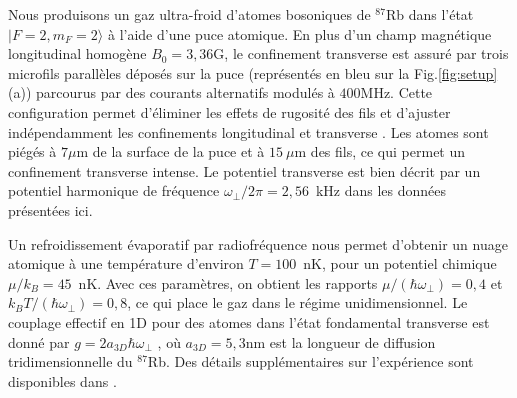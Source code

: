 


Nous produisons un gaz ultra-froid d’atomes bosoniques de $^{87}$Rb dans l’état $|F=2,m_F=2\rangle$ à l’aide d’une puce atomique. En plus d’un champ magnétique longitudinal homogène $B_0 = 3{,}36$G, le confinement transverse est assuré par trois microfils parallèles déposés sur la puce (représentés en bleu sur la Fig.\ref{fig:setup}(a)) parcourus par des courants alternatifs modulés à $400$MHz. Cette configuration permet d’éliminer les effets de rugosité des fils et d’ajuster indépendamment les confinements longitudinal et transverse \cite{PhysRevLett.98.263201}. Les atomes sont piégés à $7\mu$m de la surface de la puce et à $15~\mu$m des fils, ce qui permet un confinement transverse intense. Le potentiel transverse est bien décrit par un potentiel harmonique de fréquence $\omega_{\perp}/2\pi = 2{,}56$~kHz dans les données présentées ici.


Un refroidissement évaporatif par radiofréquence nous permet d’obtenir un nuage atomique à une température d’environ $T = 100$~nK, pour un potentiel chimique $\mu / k_B = 45$~nK. Avec ces paramètres, on obtient les rapports $\mu / (\hbar \omega_{\perp}) = 0{,}4$ et $k_B T / (\hbar \omega_{\perp}) = 0{,}8$, ce qui place le gaz dans le régime unidimensionnel. Le couplage effectif en 1D pour des atomes dans l’état fondamental transverse est donné par $g = 2 a_{3D} \hbar \omega_{\perp}$ \cite{PhysRevLett.81.938}, où $a_{3D} = 5{,}3$nm est la longueur de diffusion tridimensionnelle du $^{87}$Rb\cite{PhysRevLett.89.283202}. Des détails supplémentaires sur l’expérience sont disponibles dans \cite{duboistel-04749900}.

